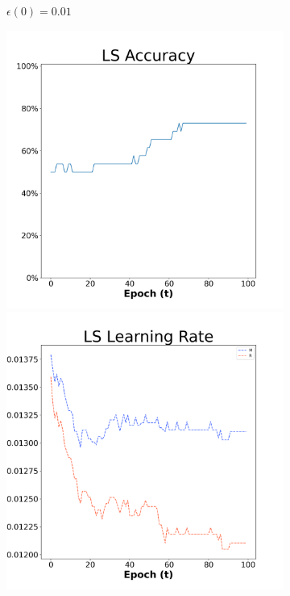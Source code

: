 \begin{figure}[H]
\begin{subfigure}{0.3\textwidth}
  \caption{$\epsilon(0)=0.01$}
\end{subfigure}\hfil %
\begin{subfigure}{0.3\textwidth}
  \includegraphics[width=\linewidth]{images/exper1/Sonar/LS_0.03_acc.png}
  \includegraphics[width=\linewidth]{images/exper1/Sonar/LS_0.03_lr.png}

\end{subfigure}
\end{figure}

